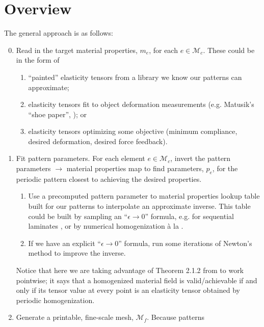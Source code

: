 \documentclass[10pt]{article}
\providecommand{\mesh}{\mathcal{M}}
\begin{document}
\section{Overview}
 The general approach is as follows:
\begin{enumerate}
    \setcounter{enumi}{-1}
    \item Read in the target material properties, $m_e$, for each $e \in
        \mesh_c$. These could be in the form of
        \label{step:read}
        \begin{enumerate}
            \item ``painted'' elasticity tensors from a library we know our
                patterns can approximate;
            \item elasticity tensors fit to object deformation measurements (e.g.
                  Matusik's ``shoe paper'', \cite{Bickel2010}); or
            \item elasticity tensors optimizing some objective (minimum
                  compliance, desired deformation, desired force
                  feedback).
        \end{enumerate}
    \item Fit pattern parameters. For each element $e \in \mesh_c$, invert the
        pattern parameters $\to$ material properties map to find parameters,
        $p_e$, for the periodic pattern closest to achieving the desired
        properties.
        \label{step:fit}
        \begin{enumerate}
            \item Use a precomputed pattern parameter to material properties
                lookup table built for our patterns to interpolate an
                approximate inverse. This table could be built by sampling an
                ``$\epsilon \to 0$'' formula, e.g. for sequential laminates
                \cite{allaire2002shape}, or by numerical homogenization \`a la
                \cite{Kharevych2009}.
            \item If we have an explicit ``$\epsilon \to 0$'' formula, run some
                iterations of Newton's method to improve the inverse.
        \end{enumerate}
        Notice that here we are taking advantage of Theorem 2.1.2 from
        \cite{allaire2002shape} to work pointwise; it says that a homogenized
        material field is valid/achievable if and only if its tensor value at
        every point is an elasticity tensor obtained by periodic homogenization.
    \item Generate a printable, fine-scale mesh, $\mesh_f$. Because patterns

\end{enumerate}
\end{document}
